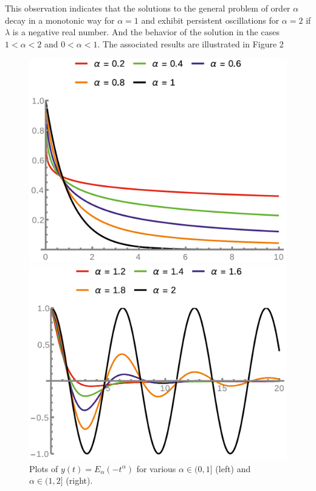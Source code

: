This observation indicates that the solutions to the general problem of order $\alpha$ 
decay in a monotonic way for $\alpha = 1$ and exhibit persistent oscillations for $\alpha = 2$ if $\lambda$ is
a negative real number. 
And the behavior of the solution in the cases $1 < \alpha < 2$ and $0 < \alpha < 1$. 
The associated results are illustrated in Figure 2
\begin{figure}[h]
    \begin{minipage}[l]{.5\textwidth}
      \includegraphics[scale = .25]{plot/1.png}
    \end{minipage}  
    \begin{minipage}[r]{.5\textwidth}
      \includegraphics[scale = .25]{plot/2.png}
    \end{minipage} 
    \caption{Plots of $y(t) = E_{\alpha}(-t^\alpha)$ for various $\alpha \in (0, 1]$ (left) and $\alpha \in (1, 2]$ (right).} 
\end{figure}

